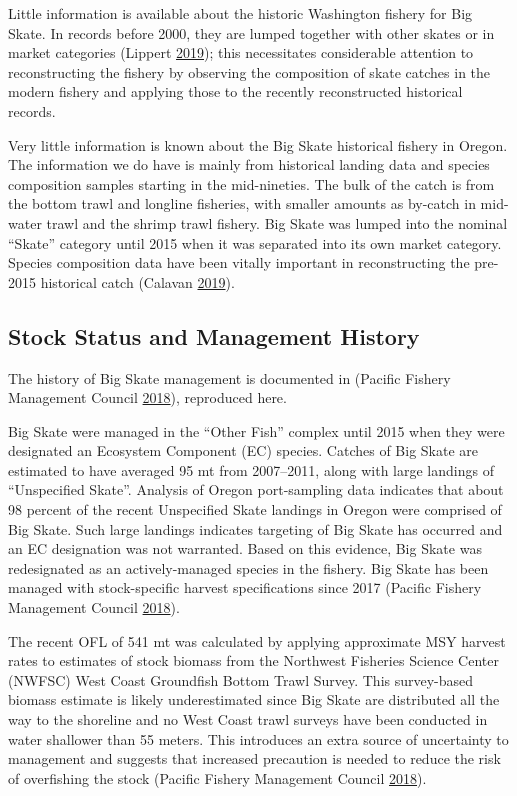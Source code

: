 \documentclass[12pt,]{article}
\begin{document}
Little information is available about the historic Washington fishery
for Big Skate. In records before 2000, they are lumped together with
other skates or in market categories (Lippert
\protect\hyperlink{ref-GregLippert}{2019}); this necessitates
considerable attention to reconstructing the fishery by observing the
composition of skate catches in the modern fishery and applying those to
the recently reconstructed historical records.

Very little information is known about the Big Skate historical fishery
in Oregon. The information we do have is mainly from historical landing
data and species composition samples starting in the mid-nineties. The
bulk of the catch is from the bottom trawl and longline fisheries, with
smaller amounts as by-catch in mid-water trawl and the shrimp trawl
fishery. Big Skate was lumped into the nominal ``Skate'' category until
2015 when it was separated into its own market category. Species
composition data have been vitally important in reconstructing the
pre-2015 historical catch (Calavan
\protect\hyperlink{ref-TedCalavan}{2019}).

\hypertarget{stock-status-and-management-history}{%
\subsection{Stock Status and Management
History}\label{stock-status-and-management-history}}

The history of Big Skate management is documented in (Pacific Fishery
Management Council \protect\hyperlink{ref-PFMC2018}{2018}), reproduced
here.

Big Skate were managed in the ``Other Fish'' complex until 2015 when
they were designated an Ecosystem Component (EC) species. Catches of Big
Skate are estimated to have averaged 95 mt from 2007--2011, along with
large landings of ``Unspecified Skate''. Analysis of Oregon
port-sampling data indicates that about 98 percent of the recent
Unspecified Skate landings in Oregon were comprised of Big Skate. Such
large landings indicates targeting of Big Skate has occurred and an EC
designation was not warranted. Based on this evidence, Big Skate was
redesignated as an actively-managed species in the fishery. Big Skate
has been managed with stock-specific harvest specifications since 2017
(Pacific Fishery Management Council
\protect\hyperlink{ref-PFMC2018}{2018}).

The recent OFL of 541 mt was calculated by applying approximate MSY
harvest rates to estimates of stock biomass from the Northwest Fisheries
Science Center (NWFSC) West Coast Groundfish Bottom Trawl Survey. This
survey-based biomass estimate is likely underestimated since Big Skate
are distributed all the way to the shoreline and no West Coast trawl
surveys have been conducted in water shallower than 55 meters. This
introduces an extra source of uncertainty to management and suggests
that increased precaution is needed to reduce the risk of overfishing
the stock (Pacific Fishery Management Council
\protect\hyperlink{ref-PFMC2018}{2018}).
\end{document}
